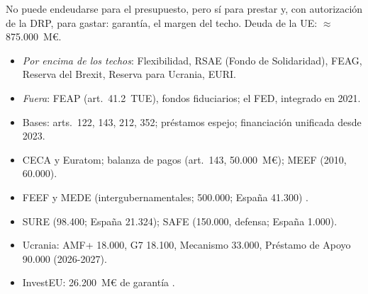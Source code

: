\documentclass{article}
\begin{document}
\begin{columnas}
\begin{ideaclave}
No puede endeudarse para el presupuesto, pero sí para prestar y, con autorización de la DRP, para gastar: garantía, el margen del techo. Deuda de la UE: $\approx$875.000~M€.
\end{ideaclave}

\begin{itemize}
\item \emph{Por encima de los techos}: Flexibilidad, RSAE (Fondo de Solidaridad), FEAG, Reserva del Brexit, Reserva para Ucrania, EURI.
\item \emph{Fuera}: FEAP (art.~41.2~TUE), fondos fiduciarios; el FED, integrado en 2021.
\end{itemize}

\begin{itemize}
\item Bases: arts.~122, 143, 212, 352; préstamos espejo; financiación unificada desde 2023.
\end{itemize}
\begin{itemize}
\item CECA y Euratom; balanza de pagos (art.~143, 50.000~M€); MEEF (2010, 60.000).
\item FEEF y MEDE (intergubernamentales; 500.000; España 41.300) .
\item SURE (98.400; España 21.324); SAFE (150.000, defensa; España 1.000).
\item Ucrania: AMF+ 18.000, G7 18.100, Mecanismo 33.000, Préstamo de Apoyo 90.000 (2026-2027).
\end{itemize}
\begin{itemize}
\item InvestEU: 26.200~M€ de garantía .
\end{itemize}


\end{columnas}
\end{document}
